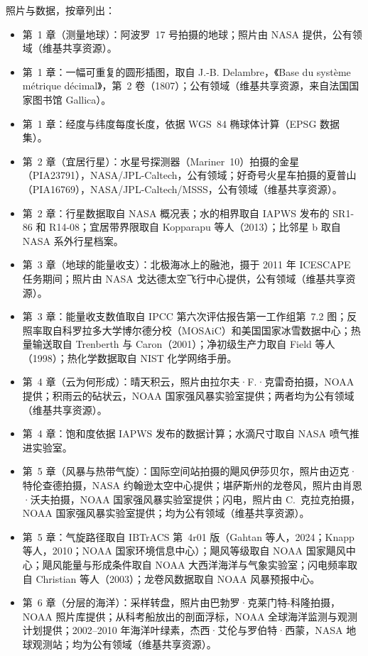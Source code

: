 \bigskip
\noindent 照片与数据，按章列出：
\begin{itemize}\small
  \item 第~1 章（测量地球）：阿波罗~17 号拍摄的地球；照片由 NASA 提供，公有领域（维基共享资源）。
  \item 第~1 章：一幅可重复的圆形插图，取自 J.-B. Delambre，《Base du système métrique décimal》，第~2 卷（1807）；公有领域（维基共享资源，来自法国国家图书馆 Gallica）。
  \item 第~1 章：经度与纬度每度长度，依据 WGS~84 椭球体计算（EPSG 数据集）。
  \item 第~2 章（宜居行星）：水星号探测器（Mariner~10）拍摄的金星（PIA23791），NASA/JPL-Caltech，公有领域；好奇号火星车拍摄的夏普山（PIA16769），NASA/JPL-Caltech/MSSS，公有领域（维基共享资源）。
  \item 第~2 章：行星数据取自 NASA 概况表；水的相界取自 IAPWS 发布的 SR1-86 和 R14-08；宜居带界限取自 Kopparapu 等人（2013）；比邻星 b 取自 NASA 系外行星档案。
  \item 第~3 章（地球的能量收支）：北极海冰上的融池，摄于 2011 年 ICESCAPE 任务期间；照片由 NASA 戈达德太空飞行中心提供，公有领域（维基共享资源）。
  \item 第~3 章：能量收支数值取自 IPCC 第六次评估报告第一工作组第~7.2 图；反照率取自科罗拉多大学博尔德分校（MOSAiC）和美国国家冰雪数据中心；热量输送取自 Trenberth 与 Caron（2001）；净初级生产力取自 Field 等人（1998）；热化学数据取自 NIST 化学网络手册。
  \item 第~4 章（云为何形成）：晴天积云，照片由拉尔夫·F.·克雷奇拍摄，NOAA 提供；积雨云的砧状云，NOAA 国家强风暴实验室提供；两者均为公有领域（维基共享资源）。
  \item 第~4 章：饱和度依据 IAPWS 发布的数据计算；水滴尺寸取自 NASA 喷气推进实验室。
  \item 第~5 章（风暴与热带气旋）：国际空间站拍摄的飓风伊莎贝尔，照片由迈克·特伦查德拍摄，NASA 约翰逊太空中心提供；堪萨斯州的龙卷风，照片由肖恩·沃夫拍摄，NOAA 国家强风暴实验室提供；闪电，照片由 C.~克拉克拍摄，NOAA 国家强风暴实验室提供；均为公有领域（维基共享资源）。
  \item 第~5 章：气旋路径取自 IBTrACS 第~4r01 版（Gahtan 等人，2024；Knapp 等人，2010；NOAA 国家环境信息中心）；飓风等级取自 NOAA 国家飓风中心；飓风能量与形成条件取自 NOAA 大西洋海洋与气象实验室；闪电频率取自 Christian 等人（2003）；龙卷风数据取自 NOAA 风暴预报中心。
  \item 第~6 章（分层的海洋）：采样转盘，照片由巴勃罗·克莱门特-科隆拍摄，NOAA 照片库提供；从科考船放出的剖面浮标，NOAA 全球海洋监测与观测计划提供；2002--2010 年海洋叶绿素，杰西·艾伦与罗伯特·西蒙，NASA 地球观测站；均为公有领域（维基共享资源）。

\end{itemize}

